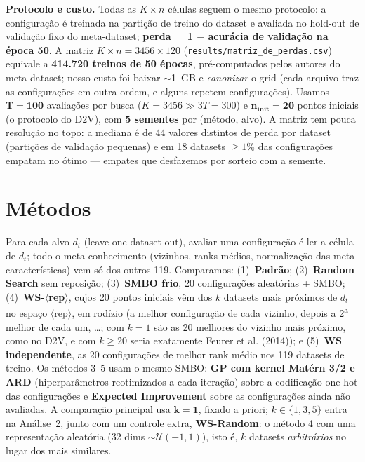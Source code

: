 \documentclass[10pt,a4paper]{article}
\newcommand{\ninit}{n_{\text{init}}}
\begin{document}
\textbf{Protocolo e custo.} Todas as $K \times n$ células seguem o mesmo protocolo: a configuração é treinada na partição de
treino do dataset e avaliada no hold-out de validação fixo do meta-dataset; \textbf{perda = 1 $-$ acurácia de validação na
época 50}. A matriz $K \times n = 3456 \times 120$ (\texttt{results/matriz\_de\_perdas.csv}) equivale a \textbf{414.720 treinos
de 50 épocas}, pré-computados pelos autores do meta-dataset; nosso custo foi baixar $\sim$1~GB e \textit{canonizar} o grid (cada
arquivo traz as configurações em outra ordem, e alguns repetem configurações). Usamos $\boldsymbol{T = 100}$ avaliações por busca
($K = 3456 \gg 3T = 300$) e $\boldsymbol{\ninit = 20}$ pontos iniciais (o protocolo do D2V), com \textbf{5 sementes} por
(método, alvo). A matriz tem pouca resolução no topo: a mediana é de 44 valores distintos de perda por dataset (partições de
validação pequenas) e em 18 datasets $\geq 1\%$ das configurações empatam no ótimo --- empates que desfazemos por sorteio com a
semente.

\section{Métodos}

Para cada alvo $d_t$ (leave-one-dataset-out), avaliar uma configuração é ler a célula de $d_t$; todo o meta-conhecimento
(vizinhos, ranks médios, normalização das meta-características) vem só dos outros 119. Comparamos: (1)~\textbf{Padrão};
(2)~\textbf{Random Search} sem reposição; (3)~\textbf{SMBO frio}, 20 configurações aleatórias + SMBO;
(4)~\textbf{WS-$\langle$rep$\rangle$}, cujos 20 pontos iniciais vêm dos $k$ datasets mais próximos de $d_t$ no espaço
$\langle$rep$\rangle$, em rodízio (a melhor configuração de cada vizinho, depois a 2\textsuperscript{a} melhor de cada um,
\ldots; com $k = 1$ são as 20 melhores do vizinho mais próximo, como no D2V, e com $k \geq 20$ seria exatamente Feurer et al.
(2014)); e (5)~\textbf{WS independente}, as 20 configurações de melhor rank médio nos 119 datasets de treino. Os métodos 3--5 usam
o mesmo SMBO: \textbf{GP com kernel Matérn 3/2 e ARD} (hiperparâmetros reotimizados a cada iteração) sobre a codificação one-hot
das configurações e \textbf{Expected Improvement} sobre as configurações ainda não avaliadas. A comparação principal usa
$\boldsymbol{k = 1}$, fixado a priori; $k \in \{1, 3, 5\}$ entra na Análise~2, junto com um controle extra,
\textbf{WS-Random}: o método 4 com uma representação aleatória (32 dims $\sim \mathcal{U}(-1, 1)$), isto é, $k$ datasets
\textit{arbitrários} no lugar dos mais similares.
\end{document}
